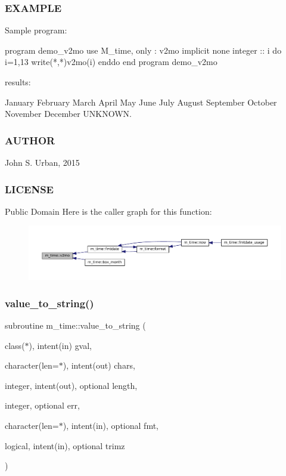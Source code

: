 \subsubsection*{E\+X\+A\+M\+P\+LE}

\begin{DoxyVerb}Sample program:

 program demo_v2mo
 use M_time, only : v2mo
 implicit none
 integer :: i
    do i=1,13
       write(*,*)v2mo(i)
    enddo
 end program demo_v2mo

results:

 January
 February
 March
 April
 May
 June
 July
 August
 September
 October
 November
 December
 UNKNOWN.
\end{DoxyVerb}
 \subsubsection*{A\+U\+T\+H\+OR}

John S. Urban, 2015 \subsubsection*{L\+I\+C\+E\+N\+SE}

Public Domain Here is the caller graph for this function\+:\nopagebreak
\begin{figure}[H]
\begin{center}
\leavevmode
\includegraphics[width=350pt]{namespacem__time_a6f28cf00e4998bb50bb503f5e4bd3f77_icgraph}
\end{center}
\end{figure}
\mbox{\label{namespacem__time_a0dac2380784afe63e06862095d589c22}} 
\subsubsection{\texorpdfstring{value\+\_\+to\+\_\+string()}{value\_to\_string()}}
{\footnotesize\ttfamily subroutine m\+\_\+time\+::value\+\_\+to\+\_\+string (\begin{DoxyParamCaption}\item[{class($\ast$), intent(in)}]{gval,  }\item[{character(len=$\ast$), intent(out)}]{chars,  }\item[{integer, intent(out), optional}]{length,  }\item[{integer, optional}]{err,  }\item[{character(len=$\ast$), intent(in), optional}]{fmt,  }\item[{logical, intent(in), optional}]{trimz }\end{DoxyParamCaption})\hspace{0.3cm}{\ttfamily [private]}}



